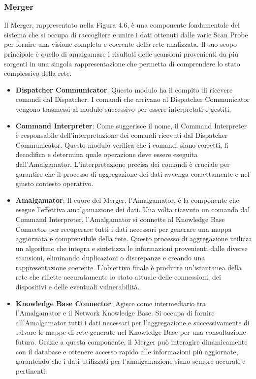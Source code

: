 \documentclass[target=bach,aauheader=,style=]{thud}
\begin{document}
\subsubsection{Merger}
Il Merger, rappresentato nella Figura 4.6, è una componente fondamentale del sistema che si occupa di raccogliere e unire i dati ottenuti dalle varie Scan Probe per fornire una visione completa e coerente della rete analizzata. Il suo scopo principale è quello di amalgamare i risultati delle scansioni provenienti da più sorgenti in una singola rappresentazione che permetta di comprendere lo stato complessivo della rete.
\begin{itemize}
  \item \textbf{Dispatcher Communicator}: Questo modulo ha il compito di ricevere comandi dal Dispatcher. I comandi che arrivano al Dispatcher Communicator vengono trasmessi al modulo successivo per essere interpretati e gestiti.

  \item \textbf{Command Interpreter}: Come suggerisce il nome, il Command Interpreter è responsabile dell'interpretazione dei comandi ricevuti dal Dispatcher Communicator. Questo modulo verifica che i comandi siano corretti, li decodifica e determina quale operazione deve essere eseguita dall'Amalgamator. L'interpretazione precisa dei comandi è cruciale per garantire che il processo di aggregazione dei dati avvenga correttamente e nel giusto contesto operativo. 

  \item \textbf{Amalgamator}: Il cuore del Merger, l'Amalgamator, è la componente che esegue l'effettiva amalgamazione dei dati. Una volta ricevuto un comando dal Command Interpreter, l'Amalgamator si connette al Knowledge Base Connector per recuperare tutti i dati necessari per generare una mappa aggiornata e comprensibile della rete. Questo processo di aggregazione utilizza un algoritmo che integra e sintetizza le informazioni provenienti dalle diverse scansioni, eliminando duplicazioni o discrepanze e creando una rappresentazione coerente. L'obiettivo finale è produrre un'istantanea della rete che riflette accuratamente lo stato attuale delle connessioni, dei dispositivi e delle eventuali vulnerabilità.

  \item \textbf{Knowledge Base Connector}: Agisce come intermediario tra l'Amalgamator e il Network Knowledge Base. Si occupa di fornire all'Amalgamator tutti i dati necessari per l'aggregazione e successivamente di salvare le mappe di rete generate nel Knowledge Base per una consultazione futura. Grazie a questa componente, il Merger può interagire dinamicamente con il database e ottenere accesso rapido alle informazioni più aggiornate, garantendo che i dati utilizzati per l'amalgamazione siano sempre accurati e pertinenti.
\end{itemize}
\end{document}
